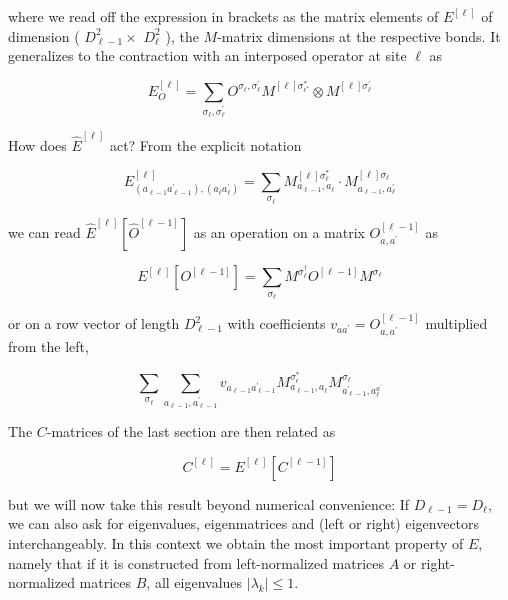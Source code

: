 \documentclass[12pt]{article}
\begin{document}
where we read off the expression in brackets as the matrix elements of $E^{[\ell]}$ of dimension ( $D_{\ell-1}^{2} \times$ $D_{\ell}^{2}$ ), the $M$-matrix dimensions at the respective bonds. It generalizes to the contraction with an interposed operator at site $\ell$ as


\begin{equation*}
E_{O}^{[\ell]}=\sum_{\sigma_{\ell}, \sigma_{\ell}^{\prime}} O^{\sigma_{\ell}, \sigma_{\ell}^{\prime}} M^{[\ell] \sigma_{\epsilon^{*}}^{*}} \otimes M^{[\ell] \sigma_{\ell}^{\prime}} \tag{106}
\end{equation*}


How does $\hat{E}^{[\ell]}$ act? From the explicit notation


\begin{equation*}
E_{\left(a_{\ell-1} a_{\ell-1}^{\prime}\right),\left(a_{\ell} a_{\ell}^{\prime}\right)}^{[\ell]}=\sum_{\sigma_{\ell}} M_{a_{\ell-1}, a_{\ell}}^{[\ell] \sigma_{\ell}^{*}} \cdot M_{a_{\ell-1}, a_{\ell}^{\prime}}^{[\ell] \sigma_{\ell}} \tag{107}
\end{equation*}


we can read $\hat{E}^{[\ell]}\left[\hat{O}^{[\ell-1]}\right]$ as an operation on a matrix $O_{a, a^{\prime}}^{[\ell-1]}$ as


\begin{equation*}
E^{[\ell]}\left[O^{[\ell-1]}\right]=\sum_{\sigma_{\ell}} M^{\sigma_{\ell}^{\dagger}} O^{[\ell-1]} M^{\sigma_{\ell}} \tag{108}
\end{equation*}


or on a row vector of length $D_{\ell-1}^{2}$ with coefficients $v_{a a^{\prime}}=O_{a, a^{\prime}}^{[\ell-1]}$ multiplied from the left,


\begin{equation*}
\sum_{\sigma_{\ell}} \sum_{a_{\ell-1}, a_{\ell-1}^{\prime}} v_{a_{\ell-1} a_{\ell-1}^{\prime}} M_{a_{\ell-1}, a_{\ell}}^{\sigma_{\epsilon}^{*}} M_{a_{\ell-1}^{\prime}, a_{\ell}^{a^{\prime}}}^{\sigma_{\ell}} \tag{109}
\end{equation*}


The $C$-matrices of the last section are then related as


\begin{equation*}
C^{[\ell]}=E^{[\ell]}\left[C^{[\ell-1]}\right] \tag{110}
\end{equation*}


but we will now take this result beyond numerical convenience: If $D_{\ell-1}=D_{\ell}$, we can also ask for eigenvalues, eigenmatrices and (left or right) eigenvectors interchangeably. In this context we obtain the most important property of $E$, namely that if it is constructed from left-normalized matrices $A$ or right-normalized matrices $B$, all eigenvalues $\left|\lambda_{k}\right| \leq 1$.
\end{document}
